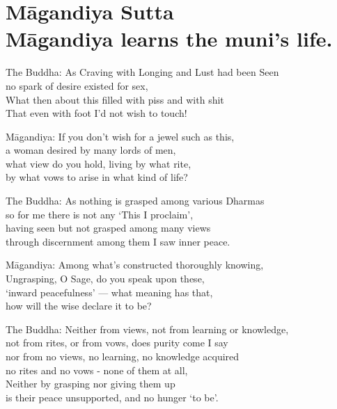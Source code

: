 \chapter{M\=agandiya Sutta\\ M\=agandiya learns the muni's life.}

\begin{MyDescription}{The Buddha:}
As Craving with Longing and Lust had been Seen\\
no spark of desire existed for sex,\\
What then about this filled with piss and with shit\\
That even with foot I'd not wish to touch!
\end{MyDescription}   

\begin{MyDescription}{M\=agandiya:}
If you don't wish for a jewel such as this,\\
a woman desired by many lords of men,\\
what view do you hold, living by what rite,\\
by what vows to arise in what kind of life?
\end{MyDescription}   

\begin{MyDescription}{The Buddha:}
As nothing is grasped among various Dharmas\\
so for me there is not any `This I proclaim',\\
having seen but not grasped among many views\\
through discernment among them I saw inner peace.
\end{MyDescription}  

\begin{MyDescription}{M\=agandiya:}
Among what's constructed thoroughly knowing,\\
Ungrasping, O Sage, do you speak upon these,\\
`inward peacefulness' — what meaning has that,\\
how will the wise declare it to be?
\end{MyDescription}   

\begin{MyDescription}{The Buddha:}
Neither from views, not from learning or knowledge,\\
not from rites, or from vows, does purity come I say\\
nor from no views, no learning, no knowledge acquired\\
no rites and no vows - none of them at all,\\
Neither by grasping nor giving them up\\
is their peace unsupported, and no hunger `to be'.
\end{MyDescription}  

